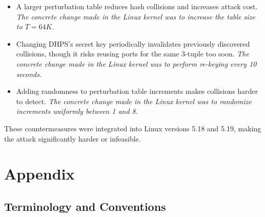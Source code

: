 \documentclass{report}
\begin{document}
\begin{itemize}
	\item {}
	A larger perturbation table reduces hash collisions and increases attack cost.
	\textit{The concrete change made in the Linux kernel was to increase the table size to $T = 64K$.}

	\item {}
	Changing DHPS’s secret key periodically invalidates previously discovered collisions, though it risks reusing ports for the same 3-tuple too soon.
	\textit{The concrete change made in the Linux kernel was to perform re-keying every 10 seconds.}

	\item {}
	Adding randomness to perturbation table increments makes collisions harder to detect.
	\textit{The concrete change made in the Linux kernel was to randomize increments uniformly between 1 and 8.}
\end{itemize}

These countermeasures were integrated into Linux versions 5.18 and 5.19, making the attack significantly harder or infeasible.

\vspace{0.5cm}
\chapter{Appendix}
\label{sec:appendix}

\section{Terminology and Conventions}
\label{sec:terminology and conventions}
\end{document}
